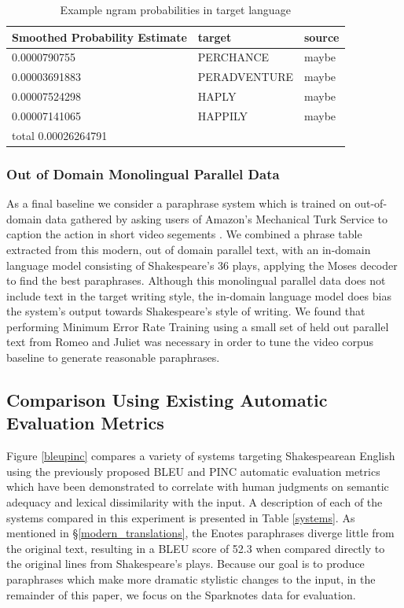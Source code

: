\documentclass[10pt,a5paper,twoside]{article}
\begin{document}
\begin{table}
  \begin{center}
  \begin{tabular}{|l|l|l|}
    \hline
    Smoothed Probability Estimate & target & source \\
    \hline
    \hline
    0.0000790755 & PERCHANCE & maybe \\
    \hline
    0.00003691883 & PERADVENTURE & maybe \\
    \hline
    0.00007524298 & HAPLY & maybe \\
    \hline
    0.00007141065 & HAPPILY & maybe \\
    \hline
    \hline
    total 0.00026264791 & & \\
    \hline
  \end{tabular}
  \end{center}
  \caption{Example ngram probabilities in target language}
  \label{word_frequency}
\end{table}

\subsubsection{Out of Domain Monolingual Parallel Data}
\label{video_baseline}
As a final baseline we consider a paraphrase system which is trained on out-of-domain data gathered by asking users of Amazon's Mechanical Turk Service 
\cite{Snow08} to caption the action in short video segements \cite{chen11}.  We combined a phrase table extracted from this modern, out of domain parallel text, with an in-domain
language model consisting of Shakespeare's 36 plays, applying the Moses decoder \cite{Koehn07} to find the best paraphrases. 
Although this monolingual parallel data does not include text in the target writing style,
the in-domain language model does bias the system's output towards Shakespeare's style of writing.
We found that performing Minimum Error Rate Training \cite{MERT} using a small set of held out parallel text from Romeo and Juliet was necessary in order to tune the
video corpus baseline to generate reasonable paraphrases.

\subsection{Comparison Using Existing Automatic Evaluation Metrics}
Figure \ref{bleupinc} compares a variety of systems targeting Shakespearean English using the previously proposed BLEU \cite{Papineni02} and PINC \cite{chen11} automatic evaluation metrics which
have been demonstrated to correlate with human judgments on semantic adequacy and lexical dissimilarity with the input.
A description of each of the systems compared in this experiment is presented in Table \ref{systems}.  As mentioned in \S \ref{modern_translations}, the Enotes paraphrases diverge little from the original text,
resulting in a BLEU score of 52.3 when compared directly to the original lines from Shakespeare's plays.  Because our goal is to produce paraphrases which make more dramatic stylistic changes to the input,
in the remainder of this paper, we focus on the Sparknotes data for evaluation.
\end{document}

